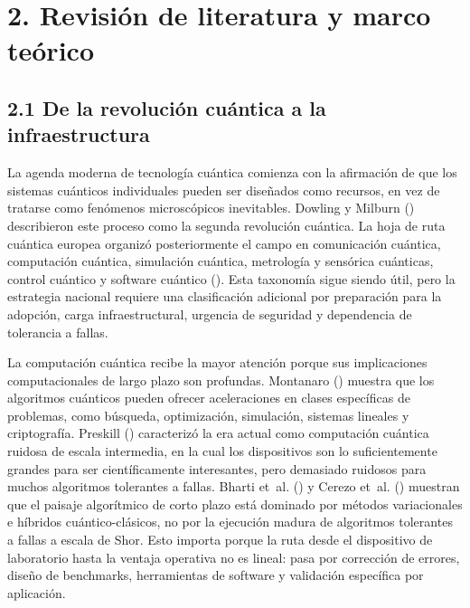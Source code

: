 \documentclass[
  11pt,
  letterpaper,
]{article}
\begin{document}
\section{2. Revisión de literatura y marco
teórico}\label{revisiuxf3n-de-literatura-y-marco-teuxf3rico}

\subsection{2.1 De la revolución cuántica a la
infraestructura}\label{de-la-revoluciuxf3n-cuuxe1ntica-a-la-infraestructura}

La agenda moderna de tecnología cuántica comienza con la afirmación de
que los sistemas cuánticos individuales pueden ser diseñados como
recursos, en vez de tratarse como fenómenos microscópicos inevitables.
Dowling y Milburn () describieron este
proceso como la segunda revolución cuántica. La hoja de ruta cuántica
europea organizó posteriormente el campo en comunicación cuántica,
computación cuántica, simulación cuántica, metrología y sensórica
cuánticas, control cuántico y software cuántico
(). Esta taxonomía sigue siendo
útil, pero la estrategia nacional requiere una clasificación adicional
por preparación para la adopción, carga infraestructural, urgencia de
seguridad y dependencia de tolerancia a fallas.

La computación cuántica recibe la mayor atención porque sus
implicaciones computacionales de largo plazo son profundas. Montanaro
() muestra que los algoritmos
cuánticos pueden ofrecer aceleraciones en clases específicas de
problemas, como búsqueda, optimización, simulación, sistemas lineales y
criptografía. Preskill () caracterizó
la era actual como computación cuántica ruidosa de escala intermedia, en
la cual los dispositivos son lo suficientemente grandes para ser
científicamente interesantes, pero demasiado ruidosos para muchos
algoritmos tolerantes a fallas. Bharti et~al.
() y Cerezo et~al.
() muestran que el paisaje algorítmico de
corto plazo está dominado por métodos variacionales e híbridos
cuántico-clásicos, no por la ejecución madura de algoritmos tolerantes a
fallas a escala de Shor. Esto importa porque la ruta desde el
dispositivo de laboratorio hasta la ventaja operativa no es lineal: pasa
por corrección de errores, diseño de benchmarks, herramientas de
software y validación específica por aplicación.
\end{document}
